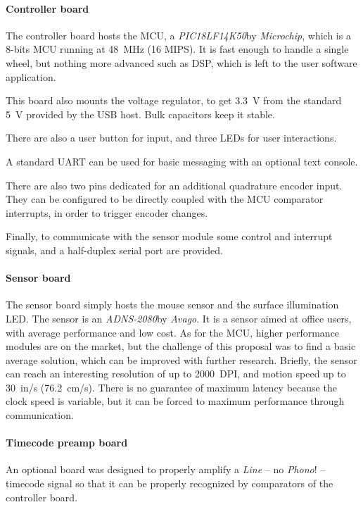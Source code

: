 \documentclass[a4paper,10pt]{article}
\begin{document}
\begin{multicols}{2}
\paragraph{Controller board}
The controller board hosts the MCU, a \emph{PIC18LF14K50}\CITEME by
\emph{Microchip}, which is a 8-bits MCU running at 48~MHz (16 MIPS).
It is fast enough to handle a single wheel, but nothing more advanced such as
DSP, which is left to the user software application.

This board also mounts the voltage regulator, to get 3.3~V from the standard
5~V provided by the USB host. Bulk capacitors keep it stable.

There are also a user button for input, and three LEDs for user interactions.

A standard UART can be used for basic messaging with an optional text console.

There are also two pins dedicated for an additional quadrature encoder input.
They can be configured to be directly coupled with the MCU comparator
interrupts, in order to trigger encoder changes.

Finally, to communicate with the sensor module some control and interrupt
signals, and a half-duplex serial port are provided.

\INSFIG


\paragraph{Sensor board}
The sensor board simply hosts the mouse sensor and the surface illumination
LED. The sensor is an \emph{ADNS-2080}\CITEME by \emph{Avago}. It is a sensor
aimed at office users, with average performance and low cost. As for the MCU,
higher performance modules are on the market, but the challenge of this
proposal was to find a basic average solution, which can be improved with
further research. Briefly, the sensor can reach an interesting resolution of
up to 2000~DPI, and motion speed up to 30~in/s (76.2~cm/s). There is no
guarantee of maximum latency because the clock speed is variable, but it can
be forced to maximum performance through communication.

\INSFIG


\paragraph{Timecode preamp board}
An optional board was designed to properly amplify a \emph{Line} -- no
\emph{Phono}! -- timecode signal so that it can be properly recognized by
comparators of the controller board.


\end{multicols}
\end{document}
